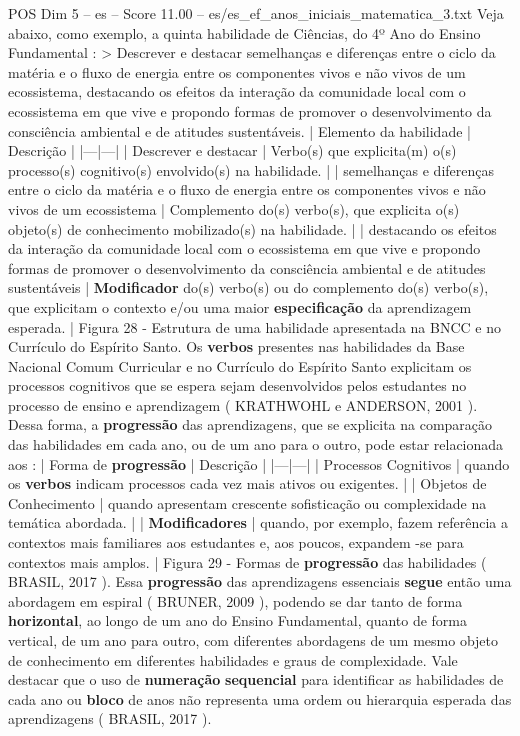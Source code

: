 \begin{textsample}{POS Dim 5 – es – Score 11.00 – es/es\_ef\_anos\_iniciais\_matematica\_3.txt}
Veja abaixo, como exemplo, a quinta habilidade de Ciências, do 4º Ano do Ensino Fundamental : > Descrever e destacar semelhanças e diferenças entre o ciclo da matéria e o fluxo de energia entre os componentes vivos e não vivos de um ecossistema, destacando os efeitos da interação da comunidade local com o ecossistema em que vive e propondo formas de promover o desenvolvimento da consciência ambiental e de atitudes sustentáveis. | Elemento da habilidade | Descrição | |---|---| | Descrever e destacar | Verbo(s) que explicita(m) o(s) processo(s) cognitivo(s) envolvido(s) na habilidade. | | semelhanças e diferenças entre o ciclo da matéria e o fluxo de energia entre os componentes vivos e não vivos de um ecossistema | Complemento do(s) verbo(s), que explicita o(s) objeto(s) de conhecimento mobilizado(s) na habilidade. | | destacando os efeitos da interação da comunidade local com o ecossistema em que vive e propondo formas de promover o desenvolvimento da consciência ambiental e de atitudes sustentáveis | \textbf{Modificador} do(s) verbo(s) ou do complemento do(s) verbo(s), que explicitam o contexto e/ou uma maior \textbf{especificação} da aprendizagem esperada. | Figura 28 - Estrutura de uma habilidade apresentada na BNCC e no Currículo do Espírito Santo.
Os \textbf{verbos} presentes nas habilidades da Base Nacional Comum Curricular e no Currículo do Espírito Santo explicitam os processos cognitivos que se espera sejam desenvolvidos pelos estudantes no processo de ensino e aprendizagem ( KRATHWOHL e ANDERSON, 2001 ).
Dessa forma, a \textbf{progressão} das aprendizagens, que se explicita na comparação das habilidades em cada ano, ou de um ano para o outro, pode estar relacionada aos : | Forma de \textbf{progressão} | Descrição | |---|---| | Processos Cognitivos | quando os \textbf{verbos} indicam processos cada vez mais ativos ou exigentes. | | Objetos de Conhecimento | quando apresentam crescente sofisticação ou complexidade na temática abordada. | | \textbf{Modificadores} | quando, por exemplo, fazem referência a contextos mais familiares aos estudantes e, aos poucos, expandem -se para contextos mais amplos. | Figura 29 - Formas de \textbf{progressão} das habilidades ( BRASIL, 2017 ).
Essa \textbf{progressão} das aprendizagens essenciais \textbf{segue} então uma abordagem em espiral ( BRUNER, 2009 ), podendo se dar tanto de forma \textbf{horizontal}, ao longo de um ano do Ensino Fundamental, quanto de forma vertical, de um ano para outro, com diferentes abordagens de um mesmo objeto de conhecimento em diferentes habilidades e graus de complexidade.
Vale destacar que o uso de \textbf{numeração} \textbf{sequencial} para identificar as habilidades de cada ano ou \textbf{bloco} de anos não representa uma ordem ou hierarquia esperada das aprendizagens ( BRASIL, 2017 ).

\end{textsample}
